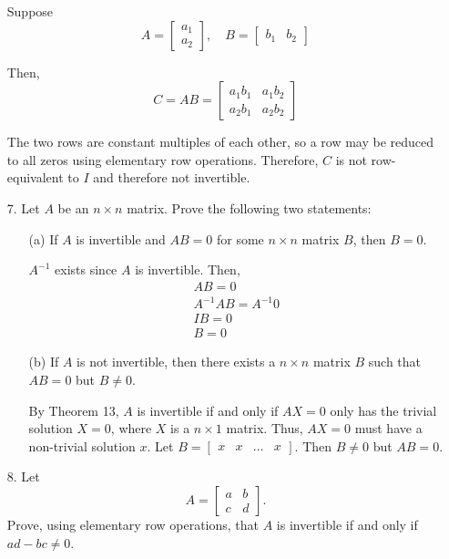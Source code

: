 \documentclass{article}
\begin{document}
\begin{enumerate}[listparindent=\parindent]
Suppose
\[
    A = \begin{bmatrix}
        a_1 \\ a_2
    \end{bmatrix}, \quad
    B = \begin{bmatrix}
        b_1 & b_2
    \end{bmatrix}
\]

Then,
\[
    C = AB = \begin{bmatrix}
        a_1b_1 & a_1b_2 \\
        a_2b_1 & a_2b_2
    \end{bmatrix}
\]

The two rows are constant multiples of each other, so a row may be reduced to all zeros
using elementary row operations.
Therefore, \(C\) is not row-equivalent to \(I\) and therefore not invertible.

\item[7.] Let \(A\) be an \(n \times n\) matrix. Prove the following two statements:
\begin{enumerate}[listparindent=\parindent]
\item[(a)] If \(A\) is invertible and \(AB = 0\) for some \(n \times n\) matrix \(B\), then \(B = 0\).

\(A^{-1}\) exists since \(A\) is invertible. Then,
\begin{gather*}
    AB = 0 \\
    A^{-1}AB = A^{-1}0 \\
    IB = 0 \\
    B = 0
\end{gather*}

\item[(b)] If \(A\) is not invertible, then there exists a \(n \times n\) matrix \(B\) such that \(AB = 0\) but \(B \neq 0\).

By Theorem 13, \(A\) is invertible if and only if \(AX = 0\) only has the trivial solution \(X = 0\), where \(X\) is a \(n \times 1\) matrix.
Thus, \(AX = 0\) must have a non-trivial solution \(x\).
Let \(B = \begin{bmatrix}x & x & \dots & x\end{bmatrix}\). Then \(B \neq 0\) but \(AB = 0\).
\end{enumerate}

\item[8.] Let
    \[
        A = \begin{bmatrix}
            a & b \\ c & d
        \end{bmatrix}.
    \]
    Prove, using elementary row operations, that \(A\) is invertible if and only if \(ad - bc \neq 0\).  


\end{enumerate}
\end{document}
